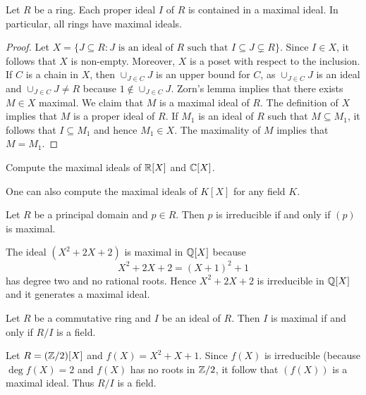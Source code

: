 \begin{theorem}
	Let $R$ be a ring. Each proper ideal $I$ of $R$ 
	is contained in a maximal ideal. 
	In particular, all rings have maximal ideals. 	
\end{theorem}

\begin{proof}
	Let $X=\{J\subseteq R:J\text{ is an ideal of $R$ such that }I\subseteq J\subsetneq R\}$.
	Since $I\in X$, it follows that $X$ is non-empty. Moreover, $X$ is a poset
	with respect to the inclusion. If $C$ is a chain in $X$, then 
	$\cup_{J\in C}J$ is an upper bound for $C$, as $\cup_{J\in C}J$ is an ideal and
	$\cup_{J\in C}J\ne R$ because $1\not\in\cup_{J\in C}J$. 	Zorn's lemma implies that
	there exists $M\in X$ maximal. We claim that $M$ is a maximal ideal of $R$. The definition
	of $X$ implies that $M$ is a proper ideal of $R$. If $M_1$ is an ideal of $R$
	such that $M\subseteq M_1$, it follows that $I\subseteq M_1$ and hence $M_1\in X$. The maximality
	of $M$ implies that $M=M_1$.  
\end{proof}

\begin{exercise}
	Compute the maximal ideals of $\mathbb{R}[X]$ and $\mathbb{C}[X]$. 	
\end{exercise}

One can also compute the maximal ideals of $K[X]$ for any field $K$. 

\begin{exercise}
	Let $R$ be a principal domain and $p\in R$. Then $p$ is irreducible 
	if and only if $(p)$ is maximal.	
\end{exercise}

\begin{example}
	The ideal $(X^2+2X+2)$ is maximal in $\mathbb{Q}[X]$ because
	\[
	X^2+2X+2=(X+1)^2+1
	\]
	has degree two and no rational roots. 
	Hence $X^2+2X+2$ is irreducible in $\mathbb{Q}[X]$ and it generates 
	a maximal ideal. 	
\end{example}

\begin{exercise}
	Let $R$ be a commutative ring and $I$ be an ideal of $R$. Then 
	$I$ is maximal if and only if $R/I$ is a field. 
\end{exercise}

\begin{example}
	Let $R=(\mathbb{Z}/2)[X]$ and $f(X)=X^2+X+1$. Since $f(X)$ is irreducible (because $\deg f(X)=2$ and
	$f(X)$ has no roots in $\mathbb{Z}/2$, it follow that $(f(X))$ is a maximal ideal. 
	Thus $R/I$ is a field. 
\end{example}


